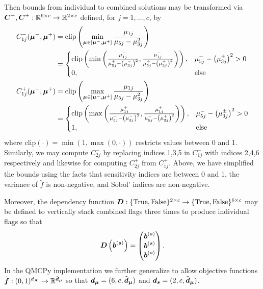 \documentclass{article}[12pt]
\begin{document}
Then bounds from individual to combined solutions may be transformed via $\boldsymbol{C}^-,\boldsymbol{C}^+:\mathbb{R}^{6 \times c} \to \mathbb{R}^{2 \times c}$ defined, for $j=1,\dots,c$, by  
\begin{align*}
    C_{1j}^-(\boldsymbol{\mu}^-,\boldsymbol{\mu}^+) 
    &= \text{clip}\left(\min_{\boldsymbol{\mu} \in [\boldsymbol{\mu}^-,\boldsymbol{\mu}^+]} \frac{\mu_{1j}}{\mu_{5j}-\mu_{3j}^2}\right) \\
    &= \begin{cases} 
        \text{clip}\left(\min\left(\frac{\mu_{1j}^-}{\mu_{5j}^+-\left(\mu_{3j}^-\right)^2},\frac{\mu_{1j}^-}{\mu_{5j}^+-\left(\mu_{3j}^+\right)^2}\right)\right), & \mu_{5j}^- - \left(\mu_{3j}^\pm\right)^2 >0 \\
        0, &\text{else}
    \end{cases} \\
    C_{1j}^+(\boldsymbol{\mu}^-,\boldsymbol{\mu}^+) 
    &= \text{clip}\left(\max_{\boldsymbol{\mu} \in [\boldsymbol{\mu}^-,\boldsymbol{\mu}^+]} \frac{\mu_{1j}}{\mu_{5j}-\mu_{3j}^2}\right) \\
    &= \begin{cases} 
        \text{clip}\left(\max\left(\frac{\mu_{1j}^+}{\mu_{5j}^--\left(\mu_{3j}^-\right)^2},\frac{\mu_{1j}^+}{\mu_{5j}^--\left(\mu_{3j}^+\right)^2}\right)\right), & \mu_{5j}^- - \left(\mu_{3j}^\pm\right)^2 >0 \\
        1, &\text{else}
    \end{cases}
\end{align*}
where $\text{clip}(\cdot) = \min(1,\max(0,\cdot))$ restricts values between 0 and 1. Similarly, we may compute $C_{2j}^-$ by replacing indices 1,3,5 in $C_{1j}^-$ with indices 2,4,6 respectively and likewise for computing $C_{2j}^+$ from $C_{1j}^+$. Above, we have simplified the bounds using the facts that sensitivity indices are between 0 and 1, the variance of $\tilde{f}$ is non-negative, and Sobol' indices are non-negative. 

Moreover, the dependency function $\boldsymbol{D}:\{\text{True},\text{False}\}^{2 \times c} \to \{\text{True},\text{False}\}^{6 \times c}$ may be defined to vertically stack combined flags three times to produce individual flags so that 
\begin{equation*}
    \boldsymbol{D}\left(\boldsymbol{b}^{(\boldsymbol{s})}\right) = \begin{pmatrix} \boldsymbol{b}^{(\boldsymbol{s})} \\ \boldsymbol{b}^{(\boldsymbol{s})} \\ \boldsymbol{b}^{(\boldsymbol{s})} \end{pmatrix}.
\end{equation*}
In the QMCPy implementation we further generalize to allow objective functions $\tilde{\boldsymbol{f}}: (0,1)^{d_{\boldsymbol{X}}} \to \mathbb{R}^{\tilde{\boldsymbol{d}}_{\boldsymbol{\mu}}}$ so that $\boldsymbol{d}_{\boldsymbol{\mu}} = (6,c,\tilde{\boldsymbol{d}}_{\boldsymbol{\mu}})$ and $\boldsymbol{d}_{\boldsymbol{s}} = (2,c,\tilde{\boldsymbol{d}}_{\boldsymbol{\mu}})$.
\end{document}
